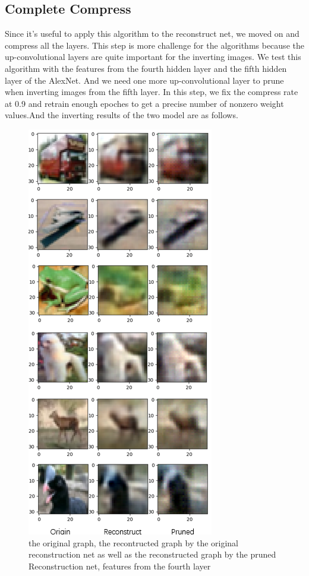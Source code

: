 \documentclass{acmtog} %
\begin{document}
\subsection{Complete Compress}
Since it's useful to apply this algorithm to the reconstruct net, we moved on and compress all the layers. This step is more challenge for the algorithms because the up-convolutional layers are quite important for the inverting images. We test this algorithm with the features from the fourth hidden layer and the fifth hidden layer of the AlexNet. And we need one more up-convolutional layer to prune when inverting images from the fifth layer. In this step, we fix the compress rate at 0.9 and retrain enough epoches to get a precise number of nonzero weight values.And the inverting results of the two model are as follows.\\
\begin{figure}[h]
  \label{fig:res3}
  \centering
  \includegraphics[scale = 0.65]{graph/exp4_result.png}
  \caption{the original graph, the recontructed graph by the original reconstruction net as well as the reconstructed graph by the pruned Reconstruction net, features from the fourth layer}
\end{figure}
\end{document}
